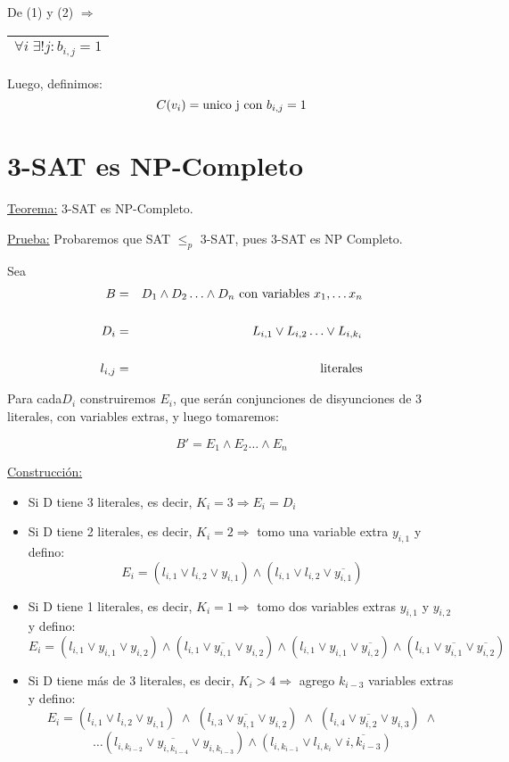 \documentclass[12pt,a4paper]{report}
\begin{document}
		De (1) y (2) $\Rightarrow$ \begin{tabular}{|c|} \hline $\forall i \; \exists ! j : b_{i, j} = 1$ \\ \hline \end{tabular}

		\vspace{3mm}
		Luego, definimos:
		\[ C(v_{i}) = \textup{unico j con } b_{i, j} = 1\]


	\section{3-SAT es NP-Completo}
		\underline{Teorema:} 3-SAT es NP-Completo.

		\vspace{3mm}
		\underline{Prueba:} Probaremos que SAT $\leq_{p}$ 3-SAT, pues 3-SAT es NP Completo.

		\vspace{3mm}
		Sea
		\begin{eqnarray}
			B &=& D_{1} \wedge D_{2} \dotsc \wedge D_{n} \textup{ con variables } x_{1}, \dotsc x_{n} \\
			\nonumber \\
			D_{i} &=& L_{i, 1} \vee L_{i, 2} \dotsc \vee L_{i, k_{i}} \\
			\nonumber \\
			l_{i, j} &=& \textup{literales}
		\end{eqnarray}

		Para cada$D_{i}$ construiremos $E_{i}$, que serán conjunciones de disyunciones de 3 literales, con variables extras, y luego tomaremos:

		\[ B' = E_{1} \wedge E_{2} \dotsc \wedge E_{n} \]

		\underline{Construcción:}
		\begin{itemize}
			\item Si D tiene 3 literales, es decir, $K_{i} = 3 \Rightarrow E_{i} = D_{i}$
			\item Si D tiene 2 literales, es decir, $K_{i} = 2 \Rightarrow$ tomo una variable extra $y_{i, 1}$ y defino:
				\[ E_{i} = (l_{i, 1} \vee l_{i, 2} \vee y_{i, 1}) \wedge (l_{i, 1} \vee l_{i, 2} \vee \overline{y_{i, 1}}) \]
			\item Si D tiene 1 literales, es decir, $K_{i} = 1 \Rightarrow$ tomo dos variables extras $y_{i, 1}$ y $y_{i, 2}$ y defino:
				\[ E_{i} = (l_{i, 1} \vee y_{i, 1} \vee y_{i, 2}) \wedge (l_{i, 1} \vee \overline{y_{i, 1}} \vee y_{i, 2}) \wedge (l_{i, 1} \vee y_{i, 1} \vee \overline{y_{i, 2}}) \wedge (l_{i, 1} \vee \overline{y_{i, 1}} \vee \overline{y_{i, 2}}) \]
			\item Si D tiene más de 3 literales, es decir, $K_{i} > 4 \Rightarrow$ agrego $k_{i-3}$ variables extras y defino:
				\[ E_{i} = (l_{i, 1} \vee l_{i, 2} \vee y_{i, 1}) \; \wedge \; (l_{i, 3} \vee \overline{y_{i, 1}} \vee y_{i, 2}) \; \wedge \; (l_{i, 4} \vee \overline{y_{i, 2}} \vee y_{i, 3}) \; \wedge \]
				\[ \dotsc (l_{i, k_{i-2}} \vee \overline{y_{i, k_{i-4}}} \vee y_{i, k_{i-3}}) \wedge (l_{i, k_{i-1}} \vee l_{i, k_{i}} \vee \overline{i, k_{i-3}}) \]
		\end{itemize}
\end{document}
